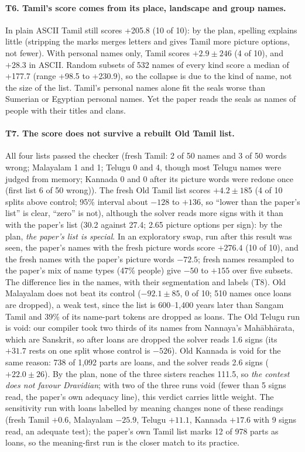 \documentclass[11pt,a4paper]{article}
\begin{document}
\paragraph{T6. Tamil's score comes from its place, landscape and group names.} In plain ASCII Tamil still scores +205.8 (10 of 10): by the plan, spelling explains little (stripping the marks merges letters and gives Tamil more picture options, not fewer). With personal names only, Tamil scores $+2.9\pm246$ (4 of 10), and $+28.3$ in ASCII. Random subsets of 532 names of every kind score a median of +177.7 (range +98.5 to +230.9), so the collapse is due to the kind of name, not the size of the list. Tamil's personal names alone fit the seals worse than Sumerian or Egyptian personal names. Yet the paper reads the seals as names of people with their titles and clans.

\paragraph{T7. The score does not survive a rebuilt Old Tamil list.} All four lists passed the checker (fresh Tamil: 2 of 50 names and 3 of 50 words wrong; Malayalam 1 and 1; Telugu 0 and 4, though most Telugu names were judged from memory; Kannada 0 and 0 after its picture words were redone once (first list 6 of 50 wrong)). The fresh Old Tamil list scores $+4.2\pm185$ (4 of 10 splits above control; 95\% interval about $-128$ to $+136$, so ``lower than the paper's list'' is clear, ``zero'' is not), although the solver reads more signs with it than with the paper's list (30.2 against 27.4; 2.65 picture options per sign): by the plan, \emph{the paper's list is special}. In an exploratory swap, run after this result was seen, the paper's names with the fresh picture words score $+276.4$ (10 of 10), and the fresh names with the paper's picture words $-72.5$; fresh names resampled to the paper's mix of name types (47\% people) give $-50$ to $+155$ over five subsets. The difference lies in the names, with their segmentation and labels (T8). Old Malayalam does not beat its control ($-92.1\pm85$, 0 of 10; 510 names once loans are dropped), a weak test, since the list is 600--1,400 years later than Sangam Tamil and 39\% of its name-part tokens are dropped as loans. The Old Telugu run is void: our compiler took two thirds of its names from Nannaya's Mahābhārata, which are Sanskrit, so after loans are dropped the solver reads 1.6 signs (its $+31.7$ rests on one split whose control is $-526$). Old Kannada is void for the same reason: 738 of 1,092 parts are loans, and the solver reads 2.6 signs ($+22.0\pm26$). By the plan, none of the three sisters reaches 111.5, so \emph{the contest does not favour Dravidian}; with two of the three runs void (fewer than 5 signs read, the paper's own adequacy line), this verdict carries little weight. The sensitivity run with loans labelled by meaning changes none of these readings (fresh Tamil $+0.6$, Malayalam $-25.9$, Telugu $+11.1$, Kannada $+17.6$ with 9 signs read, an adequate test); the paper's own Tamil list marks 12 of 978 parts as loans, so the meaning-first run is the closer match to its practice.
\end{document}
